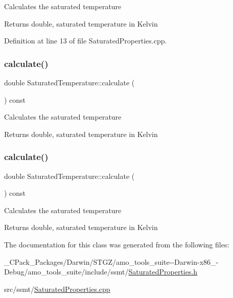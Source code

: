 Calculates the saturated temperature \begin{DoxyReturn}{Returns}
double, saturated temperature in Kelvin 
\end{DoxyReturn}


Definition at line 13 of file Saturated\+Properties.\+cpp.

\mbox{\label{class_saturated_temperature_a4aa0d2a337289dd36f4e063f1f67aaa5}} 
\subsubsection{\texorpdfstring{calculate()}{calculate()}\hspace{0.1cm}{\footnotesize\ttfamily [2/3]}}
{\footnotesize\ttfamily double Saturated\+Temperature\+::calculate (\begin{DoxyParamCaption}{ }\end{DoxyParamCaption}) const}

Calculates the saturated temperature \begin{DoxyReturn}{Returns}
double, saturated temperature in Kelvin 
\end{DoxyReturn}
\mbox{\label{class_saturated_temperature_a4aa0d2a337289dd36f4e063f1f67aaa5}} 
\subsubsection{\texorpdfstring{calculate()}{calculate()}\hspace{0.1cm}{\footnotesize\ttfamily [3/3]}}
{\footnotesize\ttfamily double Saturated\+Temperature\+::calculate (\begin{DoxyParamCaption}{ }\end{DoxyParamCaption}) const}

Calculates the saturated temperature \begin{DoxyReturn}{Returns}
double, saturated temperature in Kelvin 
\end{DoxyReturn}


The documentation for this class was generated from the following files\+:\begin{DoxyCompactItemize}
\item 
\+\_\+\+C\+Pack\+\_\+\+Packages/\+Darwin/\+S\+T\+G\+Z/amo\+\_\+tools\+\_\+suite-\/-\/\+Darwin-\/x86\+\_-\/\+Debug/amo\+\_\+tools\+\_\+suite/include/ssmt/\hyperlink{___c_pack___packages_2_darwin_2_s_t_g_z_2amo__tools__suite--_darwin-x86__64-_debug_2amo__tools__a4aa1517d601f9c2b44ebe76c8c6d4f0}{Saturated\+Properties.\+h}\item 
src/ssmt/\hyperlink{_saturated_properties_8cpp}{Saturated\+Properties.\+cpp}\end{DoxyCompactItemize}
